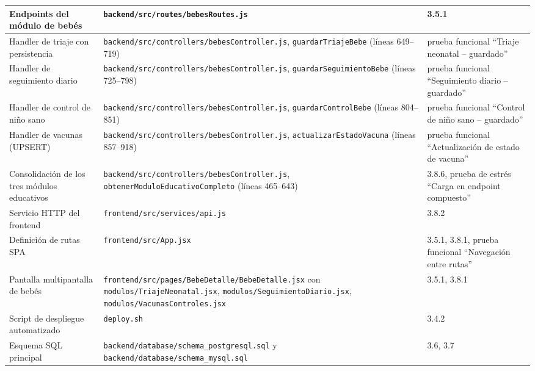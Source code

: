 \documentclass[12pt,letterpaper]{article}
\begin{document}
\begin{longtable}{p{}p{}p{}}
Endpoints del módulo de bebés & \texttt{backend/src/routes/bebesRoutes.js} & 3.5.1\\\hline
Handler de triaje con persistencia & \texttt{backend/src/controllers/bebesController.js}, \texttt{guardarTriajeBebe} (líneas 649--719) & prueba funcional ``Triaje neonatal -- guardado''\\\hline
Handler de seguimiento diario & \texttt{backend/src/controllers/bebesController.js}, \texttt{guardarSeguimientoBebe} (líneas 725--798) & prueba funcional ``Seguimiento diario -- guardado''\\\hline
Handler de control de niño sano & \texttt{backend/src/controllers/bebesController.js}, \texttt{guardarControlBebe} (líneas 804--851) & prueba funcional ``Control de niño sano -- guardado''\\\hline
Handler de vacunas (UPSERT) & \texttt{backend/src/controllers/bebesController.js}, \texttt{actualizarEstadoVacuna} (líneas 857--918) & prueba funcional ``Actualización de estado de vacuna''\\\hline
Consolidación de los tres módulos educativos & \texttt{backend/src/controllers/bebesController.js}, \texttt{obtenerModuloEducativoCompleto} (líneas 465--643) & 3.8.6, prueba de estrés ``Carga en endpoint compuesto''\\\hline
Servicio HTTP del frontend & \texttt{frontend/src/services/api.js} & 3.8.2\\\hline
Definición de rutas SPA & \texttt{frontend/src/App.jsx} & 3.5.1, 3.8.1, prueba funcional ``Navegación entre rutas''\\\hline
Pantalla multipantalla de bebés & \texttt{frontend/src/pages/BebeDetalle/BebeDetalle.jsx} con \texttt{modulos/TriajeNeonatal.jsx}, \texttt{modulos/SeguimientoDiario.jsx}, \texttt{modulos/VacunasControles.jsx} & 3.5.1, 3.8.1\\\hline
Script de despliegue automatizado & \texttt{deploy.sh} & 3.4.2\\\hline
Esquema SQL principal & \texttt{backend/database/schema\_postgresql.sql} y \texttt{backend/database/schema\_mysql.sql} & 3.6, 3.7\\\bottomrule
\end{longtable}
\end{document}
